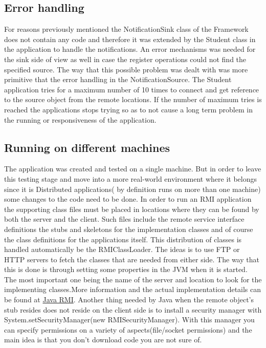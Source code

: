 \documentclass[a4paper,12pt,titlepage]{article}
\begin{document}
\subsection{Error handling}
For reasons previously mentioned the NotificationSink class of the Framework does not contain any code and therefore it was extended by the Student class in the application to handle the notifications. An error mechanisms was needed for the sink side of view as well in case the register operations could not find the specified source. The way that this possible problem was dealt with was more primitive that the error handling in the NotificationSource. The Student application tries for a maximum number of 10 times to connect and get reference to the source object from the remote locations. If the number of maximum tries is reached the applications stops trying so as to not cause a long term problem in the running or responsiveness of the application.
\subsection{Running on different machines}
The application was created and tested on a single machine. But in order to leave this testing stage and move into a more real-world environment where it belongs since it is Distributed applications( by definition runs on more than one machine) some changes to the code need to be done. In order to run an RMI application the supporting class files must be placed in locations where they can be found by both the server and the client. Such files include the remote service interface definitions the stubs and skeletons for the implementation classes and of course the class definitions for the applications itself. This distribution of classes is handled automatically be the RMIClassLoader. The ideas is to use FTP or HTTP servers to fetch the classes that are needed from either side. The way that this is done is through setting some properties in the JVM when it is started. The most important one being the name of the server and location to look for the implementing classes.More information and the actual implementation details can be found at \href{http://java.sun.com/developer/onlineTraining/rmi/RMI.html#DistributingRMIClasses}{Java RMI}. Another thing needed by Java when the remote object's stub resides does not reside on the client side is to install a security manager with System.setSecurityManager(new RMISecurityManager). With this manager you can specify permissions on a variety of aspects(file/socket permissions) and the main idea is that you don't download code you are not sure of.
\end{document}
